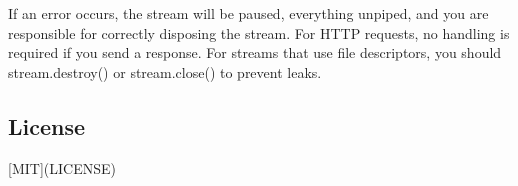If an error occurs, the stream will be paused, everything unpiped, and you are responsible for correctly disposing the stream. For H\+T\+T\+P requests, no handling is required if you send a response. For streams that use file descriptors, you should {\ttfamily stream.\+destroy()} or {\ttfamily stream.\+close()} to prevent leaks.

\subsection*{License}

\mbox{[}M\+I\+T\mbox{]}(L\+I\+C\+E\+N\+S\+E) 